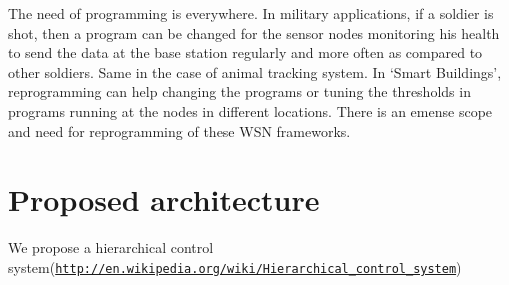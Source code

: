 \documentclass[twocolumn]{article}
\begin{document}
The need of programming is everywhere. In military applications, if a soldier is shot, then a program can be changed for the sensor nodes monitoring his health to send the data at the base station regularly and more often as compared to other soldiers. Same in the case of animal tracking system. In `Smart Buildings', reprogramming can help changing the programs or tuning the thresholds in programs running at the nodes in different locations. There is an emense scope and need for reprogramming of these WSN frameworks.

\section{Proposed architecture}
We propose a hierarchical control system(\href{http://en.wikipedia.org/wiki/Hierarchical_control_system}{\nolinkurl{http://en.wikipedia.org/wiki/Hierarchical\_control\_system}})
\end{document}

